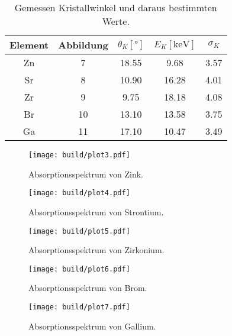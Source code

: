 \begin{table}[H]
  \centering
  \caption{Gemessen Kristallwinkel und daraus bestimmten Werte.}
  \label{tab:Absorption_aus}
  \begin{tabular}{c S[table-format=2.0] S S S[table-format=1.2] }
  \toprule
  {Element} & {Abbildung} & {$\theta_{K} [\si{\degree}]$} & {$E_{K} [\si{\kilo\electronvolt}]$}& {$\sigma_K$}\\
  \midrule
    Zn & 7  & 18.55 & 9.68  & 3.57 \\
    Sr & 8  & 10.90 & 16.28 & 4.01 \\
    Zr & 9  &  9.75 & 18.18 & 4.08 \\
    Br & 10 & 13.10 & 13.58 & 3.75 \\
    Ga & 11 & 17.10 & 10.47 & 3.49 \\ 
  \bottomrule
  \end{tabular}
\end{table}

\begin{figure}[H]
  \centering
  \texttt{[image: build/plot3.pdf]}
  \caption{Absorptionsspektrum von Zink.}
  \label{fig:plot3}
\end{figure}

\begin{figure}[H]
  \centering
  \texttt{[image: build/plot4.pdf]}
  \caption{Absorptionsspektrum von Strontium.}
  \label{fig:plot4}
\end{figure}

\begin{figure}[H]
  \centering
  \texttt{[image: build/plot5.pdf]}
  \caption{Absorptionsspektrum von Zirkonium.}
  \label{fig:plot5}
\end{figure}

\begin{figure}[H]
  \centering
  \texttt{[image: build/plot6.pdf]}
  \caption{Absorptionsspektrum von Brom.}
  \label{fig:plot6}
\end{figure}

\begin{figure}[H]
  \centering
  \texttt{[image: build/plot7.pdf]}
  \caption{Absorptionsspektrum von Gallium.}
  \label{fig:plot7}
\end{figure}


